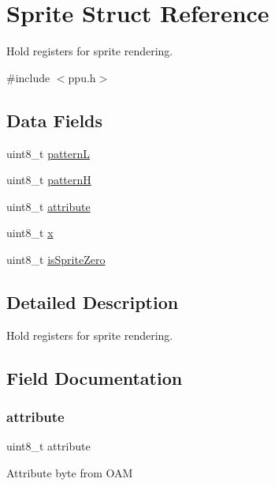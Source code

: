 \hypertarget{struct_sprite}{}\section{Sprite Struct Reference}
\label{struct_sprite}


Hold registers for sprite rendering.  




{\ttfamily \#include $<$ppu.\+h$>$}

\subsection*{Data Fields}
\begin{DoxyCompactItemize}
\item 
uint8\+\_\+t \hyperlink{struct_sprite_a91d02c831be189ce00055deda7f1d6d2}{patternL}
\item 
uint8\+\_\+t \hyperlink{struct_sprite_aea33d1255f3c4b63d8467c943eb5eb8c}{patternH}
\item 
uint8\+\_\+t \hyperlink{struct_sprite_ae99e080fe352a99a12cf5b9b260ef734}{attribute}
\item 
uint8\+\_\+t \hyperlink{struct_sprite_a0f561e77fa0f040b637f4e04f6cd8078}{x}
\item 
uint8\+\_\+t \hyperlink{struct_sprite_ad83cee8a398b8f41f0cf56ed68a19de8}{is\+Sprite\+Zero}
\end{DoxyCompactItemize}


\subsection{Detailed Description}
Hold registers for sprite rendering. 

\subsection{Field Documentation}
\mbox{\label{struct_sprite_ae99e080fe352a99a12cf5b9b260ef734}} 
\subsubsection{\texorpdfstring{attribute}{attribute}}
{\footnotesize\ttfamily uint8\+\_\+t attribute}

Attribute byte from O\+AM \mbox{\label{struct_sprite_ad83cee8a398b8f41f0cf56ed68a19de8}} 

